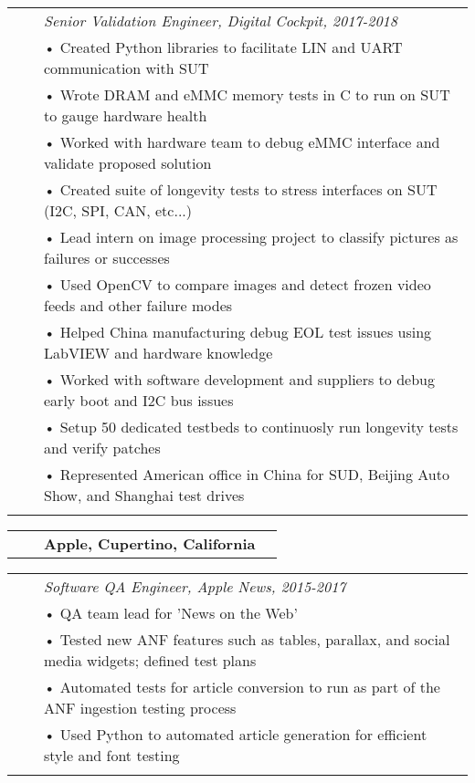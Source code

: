 \documentclass{minimal}
\begin{document}
\begin{tabular}{ p{1.5cm} p{1cm} p{16cm} }
& & \textit{Senior Validation Engineer, Digital Cockpit, 2017-2018}\\
& & • Created Python libraries to facilitate LIN and UART communication with SUT\\
& & • Wrote DRAM and eMMC memory tests in C to run on SUT to gauge hardware health\\
& & • Worked with hardware team to debug eMMC interface and validate proposed solution\\
& & • Created suite of longevity tests to stress interfaces on SUT (I2C, SPI, CAN, etc...)\\
& & • Lead intern on image processing project to classify pictures as failures or successes\\
& & • Used OpenCV to compare images and detect frozen video feeds and other failure modes\\
& & • Helped China manufacturing debug EOL test issues using LabVIEW and hardware knowledge\\
& & • Worked with software development and suppliers to debug early boot and I2C bus issues\\
& & • Setup 50 dedicated testbeds to continuosly run longevity tests and verify patches\\
& & • Represented American office in China for SUD, Beijing Auto Show, and Shanghai test drives\\
& & \\
\end{tabular}

\begin{tabular}{ p{1.5cm} p{1cm} p{10cm} >{\raggedleft\arraybackslash}p{3cm} }
& & \textbf{Apple, Cupertino, California} & \\
\end{tabular}

\begin{tabular}{ p{1.5cm} p{1cm} p{16cm} }
& & \textit{Software QA Engineer, Apple News, 2015-2017}\\
& & • QA team lead for 'News on the Web'\\
& & • Tested new ANF features such as tables, parallax, and social media widgets; defined test plans\\
& & • Automated tests for article conversion to run as part of the ANF ingestion testing process\\
& & • Used Python to automated article generation for efficient style and font testing\\
& & \\
\end{tabular}
\end{document}
